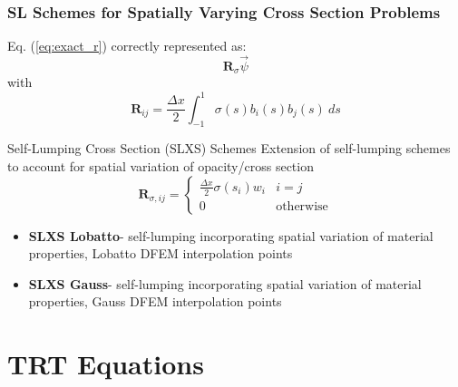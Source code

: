 \documentclass{beamer}
\newcommand{\be}{\begin{equation*}}   %
\newcommand{\ee}{\end{equation*}}
\newcommand{\eqt}[1]{Eq. (\ref{#1})}  %
\newcommand{\B}[1]{\ensuremath{b_{#1} }}			%
\begin{document}
\begin{frame}
\frametitle{SL Schemes for Spatially Varying Cross Section Problems}
\vspace{-0.1in}
\eqt{eq:exact_r} correctly represented as:
\vspace{-0.1in}
\be
\mathbf{R}_{\sigma}\vec{\psi}
\ee 
with
\vspace{-0.1in}
\be
\mathbf{R}_{ij} = \frac{\Delta x}{2}\int_{-1}^1{ \sigma(s) \B{i}(s) \B{j}(s)~ds}
\ee
\vspace{-0.1in}
%
\begin{block}{Self-Lumping Cross Section (SLXS) Schemes}
Extension of self-lumping schemes to account for spatial variation of opacity/cross section
\be
\mathbf{R}_{\sigma,ij}= \left \{ \begin{array}{ll}  \frac{\Delta x }{2}\sigma(s_i) w_i  & i=j \\ 0 & \text{otherwise} \end{array} \right.
\ee
\end{block}
\begin{itemize}
\item {\bf SLXS Lobatto}- self-lumping incorporating spatial variation of material properties, Lobatto DFEM interpolation points 
\item {\bf SLXS Gauss}- self-lumping incorporating spatial variation of material properties, Gauss DFEM interpolation points
\end{itemize}
%
\end{frame}

\section{TRT Equations}
\end{document}
